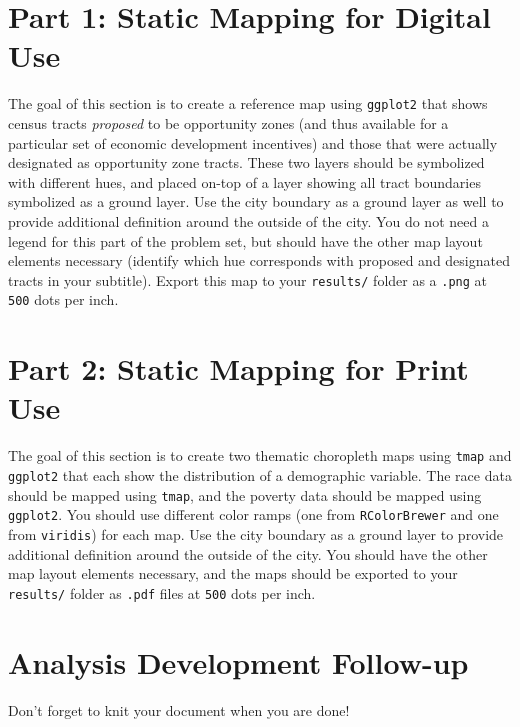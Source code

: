 \documentclass{tufte-handout}
\begin{document}
\vspace{5mm}
\section{Part 1: Static Mapping for Digital Use}
The goal of this section is to create a reference map using \texttt{ggplot2} that shows census tracts \textit{proposed} to be opportunity zones (and thus available for a particular set of economic development incentives) and those that were actually designated as opportunity zone tracts. These two layers should be symbolized with different hues, and placed on-top of a layer showing all tract boundaries symbolized as a ground layer. Use the city boundary as a ground layer as well to provide additional definition around the outside of the city. You do not need a legend for this part of the problem set, but should have the other map layout elements necessary (identify which hue corresponds with proposed and designated tracts in your subtitle). Export this map to your \texttt{results/} folder as a \texttt{.png} at \texttt{500} dots per inch.

\vspace{5mm}
\section{Part 2: Static Mapping for Print Use}
The goal of this section is to create two thematic choropleth maps using \texttt{tmap} and \texttt{ggplot2} that each show the distribution of a demographic variable. The race data should be mapped using \texttt{tmap}, and the poverty data should be mapped using \texttt{ggplot2}. You should use different color ramps (one from \texttt{RColorBrewer} and one from \texttt{viridis}) for each map. Use the city boundary as a ground layer to provide additional definition around the outside of the city. You should have the other map layout elements necessary, and the maps should be exported to your \texttt{results/} folder as \texttt{.pdf} files at \texttt{500} dots per inch.

\vspace{5mm}
\section{Analysis Development Follow-up}
Don't forget to knit your document when you are done!

\end{document}
